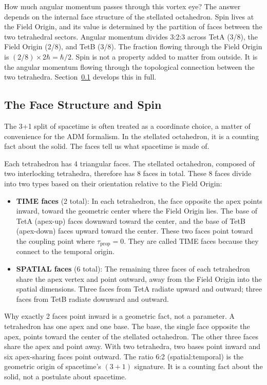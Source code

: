 \documentclass[aps,prd,preprint,superscriptaddress,showpacs,preprintnumbers,amsmath,amssymb,nofootinbib]{revtex4-2}
\begin{document}
How much angular momentum passes through this vortex eye? The answer depends on the internal face structure of the stellated octahedron. Spin lives at the Field Origin, and its value is determined by the partition of faces between the two tetrahedral sectors. Angular momentum divides 3:2:3 across TetA (3/8), the Field Origin (2/8), and TetB (3/8). The fraction flowing through the Field Origin is $(2/8) \times 2\hbar = \hbar/2$. Spin is not a property added to matter from outside. It is the angular momentum flowing through the topological connection between the two tetrahedra. Section~\ref{subsec:faces} develops this in full.

\subsection{The Face Structure and Spin}
\label{subsec:faces}

The 3+1 split of spacetime is often treated as a coordinate choice, a matter of convenience for the ADM formalism. In the stellated octahedron, it is a counting fact about the solid. The faces tell us what spacetime is made of.

Each tetrahedron has 4 triangular faces. The stellated octahedron, composed of two interlocking tetrahedra, therefore has 8 faces in total. These 8 faces divide into two types based on their orientation relative to the Field Origin:

\begin{itemize}
\item \textbf{TIME faces} (2 total): In each tetrahedron, the face opposite the apex points inward, toward the geometric center where the Field Origin lies. The base of TetA (apex-up) faces downward toward the center, and the base of TetB (apex-down) faces upward toward the center. These two faces point toward the coupling point where $\tau_{\text{prop}} = 0$. They are called TIME faces because they connect to the temporal origin.
\item \textbf{SPATIAL faces} (6 total): The remaining three faces of each tetrahedron share the apex vertex and point outward, away from the Field Origin into the spatial dimensions. Three faces from TetA radiate upward and outward; three faces from TetB radiate downward and outward.
\end{itemize}

Why exactly 2 faces point inward is a geometric fact, not a parameter. A tetrahedron has one apex and one base. The base, the single face opposite the apex, points toward the center of the stellated octahedron. The other three faces share the apex and point away. With two tetrahedra, two bases point inward and six apex-sharing faces point outward. The ratio 6:2 (spatial:temporal) is the geometric origin of spacetime's $(3{+}1)$ signature. It is a counting fact about the solid, not a postulate about spacetime.
\end{document}
